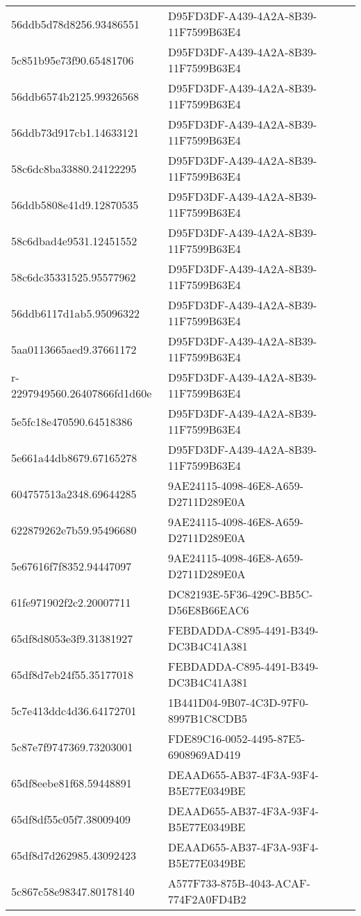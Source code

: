 \begin{tabular}{ll}
56ddb5d78d8256.93486551 & D95FD3DF-A439-4A2A-8B39-11F7599B63E4 \\
5c851b95e73f90.65481706 & D95FD3DF-A439-4A2A-8B39-11F7599B63E4 \\
56ddb6574b2125.99326568 & D95FD3DF-A439-4A2A-8B39-11F7599B63E4 \\
56ddb73d917cb1.14633121 & D95FD3DF-A439-4A2A-8B39-11F7599B63E4 \\
58c6dc8ba33880.24122295 & D95FD3DF-A439-4A2A-8B39-11F7599B63E4 \\
56ddb5808e41d9.12870535 & D95FD3DF-A439-4A2A-8B39-11F7599B63E4 \\
58c6dbad4e9531.12451552 & D95FD3DF-A439-4A2A-8B39-11F7599B63E4 \\
58c6dc35331525.95577962 & D95FD3DF-A439-4A2A-8B39-11F7599B63E4 \\
56ddb6117d1ab5.95096322 & D95FD3DF-A439-4A2A-8B39-11F7599B63E4 \\
5aa0113665aed9.37661172 & D95FD3DF-A439-4A2A-8B39-11F7599B63E4 \\
r-2297949560.26407866fd1d60e & D95FD3DF-A439-4A2A-8B39-11F7599B63E4 \\
5e5fc18e470590.64518386 & D95FD3DF-A439-4A2A-8B39-11F7599B63E4 \\
5e661a44db8679.67165278 & D95FD3DF-A439-4A2A-8B39-11F7599B63E4 \\
604757513a2348.69644285 & 9AE24115-4098-46E8-A659-D2711D289E0A \\
622879262e7b59.95496680 & 9AE24115-4098-46E8-A659-D2711D289E0A \\
5e67616f7f8352.94447097 & 9AE24115-4098-46E8-A659-D2711D289E0A \\
61fe971902f2c2.20007711 & DC82193E-5F36-429C-BB5C-D56E8B66EAC6 \\
65df8d8053e3f9.31381927 & FEBDADDA-C895-4491-B349-DC3B4C41A381 \\
65df8d7eb24f55.35177018 & FEBDADDA-C895-4491-B349-DC3B4C41A381 \\
5c7e413ddc4d36.64172701 & 1B441D04-9B07-4C3D-97F0-8997B1C8CDB5 \\
5c87e7f9747369.73203001 & FDE89C16-0052-4495-87E5-6908969AD419 \\
65df8eebe81f68.59448891 & DEAAD655-AB37-4F3A-93F4-B5E77E0349BE \\
65df8df55c05f7.38009409 & DEAAD655-AB37-4F3A-93F4-B5E77E0349BE \\
65df8d7d262985.43092423 & DEAAD655-AB37-4F3A-93F4-B5E77E0349BE \\
5c867c58e98347.80178140 & A577F733-875B-4043-ACAF-774F2A0FD4B2 \\

\end{tabular}
